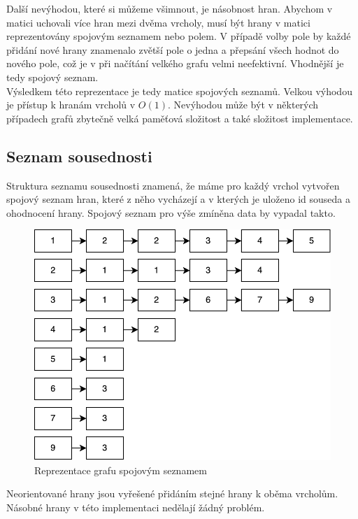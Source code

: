 Další nevýhodou, které si můžeme všimnout, je násobnost hran. Abychom v matici uchovali více hran mezi dvěma vrcholy, musí být hrany v matici reprezentovány spojovým seznamem nebo polem. V případě volby pole by každé přidání nové hrany znamenalo zvětší pole o jedna a přepsání všech hodnot do nového pole, což je v při načítání velkého grafu velmi neefektivní. Vhodnější je tedy spojový seznam.\\

Výsledkem této reprezentace je tedy matice spojových seznamů. Velkou výhodou je přístup k hranám vrcholů v $O(1)$. Nevýhodou může být v některých případech grafů zbytečně velká paměťová složitost a také složitost implementace.


\subsection{Seznam sousednosti}
Struktura seznamu sousednosti znamená, že máme pro každý vrchol vytvořen spojový seznam hran, které z něho vycházejí a v kterých je uloženo id souseda a ohodnocení hrany. Spojový seznam pro výše zmíněna data by vypadal takto.\\

\begin{figure}[!h]
	\centering
	 \includegraphics[scale=0.5]{spojak.pdf}
	\caption{Reprezentace grafu spojovým seznamem}
\end{figure}

Neorientované hrany jsou vyřešené přidáním stejné hrany k oběma vrcholům. Násobné hrany v této implementaci nedělají žádný problém.\\


